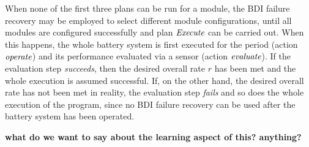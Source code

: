 When none of the first three plans can be run for a module, the BDI failure recovery may be employed to select different module configurations, until all modules are configured successfully and plan $\operatorname{\textit{Execute}}$ can be carried out. When this happens, the whole battery system is first executed for the period (action $\operatorname{\textit{operate}}$) and its performance evaluated via a sensor (action $\operatorname{\textit{evaluate}}$). If the evaluation step \emph{succeeds}, then the desired overall rate $r$ has been met and the whole execution is assumed successful. If, on the other hand, the desired overall rate has not been met in reality, the evaluation step \emph{fails} and so does the whole execution of the program, since no BDI failure recovery can be used after the battery system has been operated. 


\textbf{what do we want to say about the learning aspect of this? anything?}







